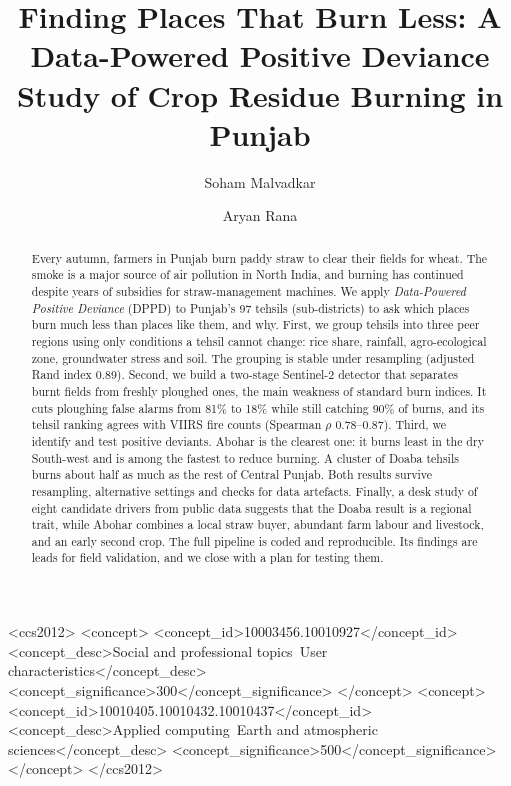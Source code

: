 \documentclass[sigconf,nonacm]{acmart}
\begin{document}
\title{Finding Places That Burn Less: A Data-Powered Positive Deviance Study of Crop Residue Burning in Punjab}

\author{Soham Malvadkar}

\author{Aryan Rana}

\renewcommand{\shortauthors}{Malvadkar and Rana}

\begin{abstract}
Every autumn, farmers in Punjab burn paddy straw to clear their fields for wheat. The smoke is a major source of air pollution in North India, and burning has continued despite years of subsidies for straw-management machines. We apply \emph{Data-Powered Positive Deviance} (DPPD) to Punjab's 97 tehsils (sub-districts) to ask which places burn much less than places like them, and why. First, we group tehsils into three peer regions using only conditions a tehsil cannot change: rice share, rainfall, agro-ecological zone, groundwater stress and soil. The grouping is stable under resampling (adjusted Rand index 0.89). Second, we build a two-stage Sentinel-2 detector that separates burnt fields from freshly ploughed ones, the main weakness of standard burn indices. It cuts ploughing false alarms from 81\% to 18\% while still catching 90\% of burns, and its tehsil ranking agrees with VIIRS fire counts (Spearman $\rho$ 0.78--0.87). Third, we identify and test positive deviants. Abohar is the clearest one: it burns least in the dry South-west and is among the fastest to reduce burning. A cluster of Doaba tehsils burns about half as much as the rest of Central Punjab. Both results survive resampling, alternative settings and checks for data artefacts. Finally, a desk study of eight candidate drivers from public data suggests that the Doaba result is a regional trait, while Abohar combines a local straw buyer, abundant farm labour and livestock, and an early second crop. The full pipeline is coded and reproducible. Its findings are leads for field validation, and we close with a plan for testing them.
\end{abstract}

\begin{CCSXML}
<ccs2012>
<concept>
<concept_id>10003456.10010927</concept_id>
<concept_desc>Social and professional topics~User characteristics</concept_desc>
<concept_significance>300</concept_significance>
</concept>
<concept>
<concept_id>10010405.10010432.10010437</concept_id>
<concept_desc>Applied computing~Earth and atmospheric sciences</concept_desc>
<concept_significance>500</concept_significance>
</concept>
</ccs2012>
\end{CCSXML}
\end{document}
